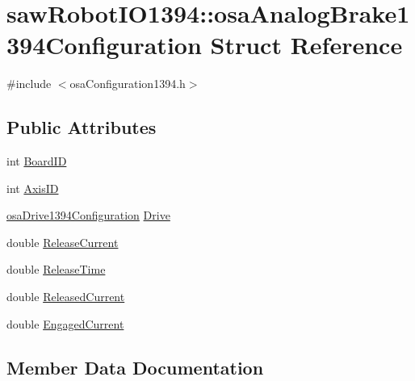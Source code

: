 \hypertarget{structsaw_robot_i_o1394_1_1osa_analog_brake1394_configuration}{}\section{saw\+Robot\+I\+O1394\+:\+:osa\+Analog\+Brake1394\+Configuration Struct Reference}
\label{structsaw_robot_i_o1394_1_1osa_analog_brake1394_configuration}


{\ttfamily \#include $<$osa\+Configuration1394.\+h$>$}

\subsection*{Public Attributes}
\begin{DoxyCompactItemize}
\item 
int \hyperlink{structsaw_robot_i_o1394_1_1osa_analog_brake1394_configuration_a4291ae827ec158fd984ca6d9000da2e5}{Board\+I\+D}
\item 
int \hyperlink{structsaw_robot_i_o1394_1_1osa_analog_brake1394_configuration_a230499c3c03a554e756126c21c7f78ae}{Axis\+I\+D}
\item 
\hyperlink{structsaw_robot_i_o1394_1_1osa_drive1394_configuration}{osa\+Drive1394\+Configuration} \hyperlink{structsaw_robot_i_o1394_1_1osa_analog_brake1394_configuration_a1fde507ba37c196a4c1cf11ef85a1cc6}{Drive}
\item 
double \hyperlink{structsaw_robot_i_o1394_1_1osa_analog_brake1394_configuration_af5510d1dccfcdebef0ff4ddebc96a287}{Release\+Current}
\item 
double \hyperlink{structsaw_robot_i_o1394_1_1osa_analog_brake1394_configuration_aa948092dd9e95e724395762b36279c1d}{Release\+Time}
\item 
double \hyperlink{structsaw_robot_i_o1394_1_1osa_analog_brake1394_configuration_a84d601103d9975fabaccb7fc9b433a8d}{Released\+Current}
\item 
double \hyperlink{structsaw_robot_i_o1394_1_1osa_analog_brake1394_configuration_a813543fd6935dd9de1a6a225fe554d26}{Engaged\+Current}
\end{DoxyCompactItemize}


\subsection{Member Data Documentation}
\hypertarget{structsaw_robot_i_o1394_1_1osa_analog_brake1394_configuration_a230499c3c03a554e756126c21c7f78ae}{}
